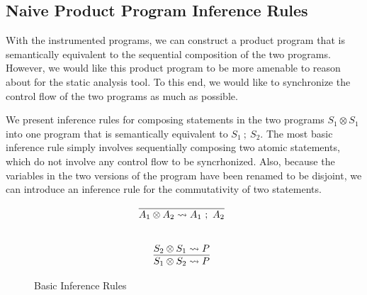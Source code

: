 \documentclass[letterpaper,twocolumn,10pt]{article}
\newcommand{\cross}{\otimes{}}
\begin{document}
	




\subsection{Naive Product Program Inference Rules}

With the instrumented programs, we can construct a product program that is semantically equivalent to the sequential composition of the two programs. However, we would like this product program to be more amenable to reason about for the static analysis tool. To this end, we would like to synchronize the control flow of the two programs as much as possible. 

We present inference rules for composing statements in the two programs $S_1 \cross S_1$ into one program that is semantically equivalent to $S_1\ ;\ S_2$. The most basic inference rule simply involves sequentially composing two atomic statements, which do not involve any control flow to be syncrhonized. Also, because the variables in the two versions of the program have been renamed to be disjoint, we can introduce an inference rule for the commutativity of two statements.  

\begin{figure}
    \label{fig:infrules1}
    \caption{Basic Inference Rules}
    \[
		\begin{array}{c}
			\infer[]{A_1 \cross A_2 \leadsto A_1\ ;\ A_2}{} \\ \\ \\
			\infer[]{S_1 \cross S_2 \leadsto P}{
				S_2 \cross S_1 \leadsto P
			}
        \end{array}
    \]
\end{figure}
\end{document}

